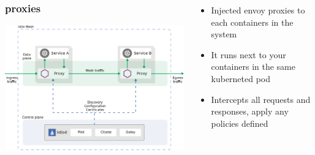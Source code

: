 \documentclass[12pt]{beamer}
\begin{document}
        \begin{frame}
            \begin{columns}
                    \begin{center}
                        \frametitle{proxies}
                        \includegraphics[width=1\textwidth]{images/proxies.png}
                    \end{center}

                    \begin{itemize}
                        \pause
                        \item Injected envoy proxies to each containers in the system
                        \pause
                        \item It runs next to your containers in the same kuberneted pod
                        \pause
                        \item Intercepts all requests and responses, apply any policies defined
                    \end{itemize}
                \end{columns}
            \end{frame}
\end{document}

